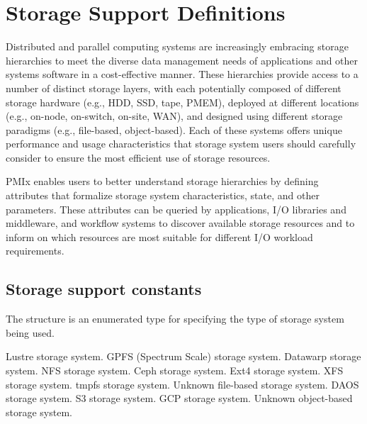 \chapter{Storage Support Definitions}
\label{chap:api_storage}

Distributed and parallel computing systems are increasingly embracing storage hierarchies to meet the diverse data management needs of applications and other systems software in a cost-effective manner.
These hierarchies provide access to a number of distinct storage layers, with each potentially composed of different storage hardware (e.g., HDD, SSD, tape, PMEM), deployed at different locations (e.g., on-node, on-switch, on-site, WAN), and designed using different storage paradigms (e.g., file-based, object-based).
Each of these systems offers unique performance and usage characteristics that storage system users should carefully consider to ensure the most efficient use of storage resources.

PMIx enables users to better understand storage hierarchies by defining attributes that formalize storage system characteristics, state, and other parameters.
These attributes can be queried by applications, I/O libraries and middleware, and workflow systems to discover available storage resources and to inform on which resources are most suitable for different I/O workload requirements.

\section{Storage support constants}


The  structure is an enumerated type for specifying the type of storage system being used.

\begin{constantdesc}
%
Lustre storage system.
%
GPFS (Spectrum Scale) storage system.
%
Datawarp storage system.
%
NFS storage system.
%
Ceph storage system.
%
Ext4 storage system.
%
XFS storage system.
%
tmpfs storage system.
%
Unknown file-based storage system.
%
DAOS storage system.
%
S3 storage system.
%
GCP storage system.
%
Unknown object-based storage system.
%
\end{constantdesc}


